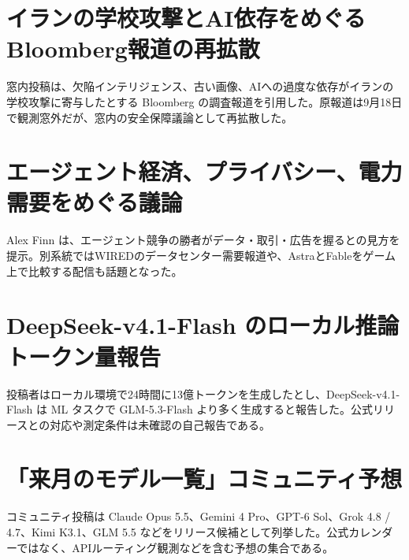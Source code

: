 \section{イランの学校攻撃とAI依存をめぐるBloomberg報道の再拡散}
窓内投稿は、欠陥インテリジェンス、古い画像、AIへの過度な依存がイランの学校攻撃に寄与したとする Bloomberg の調査報道を引用した。原報道は9月18日で観測窓外だが、窓内の安全保障議論として再拡散した。

\section{エージェント経済、プライバシー、電力需要をめぐる議論}
Alex Finn は、エージェント競争の勝者がデータ・取引・広告を握るとの見方を提示。別系統ではWIREDのデータセンター需要報道や、AstraとFableをゲーム上で比較する配信も話題となった。

\section{DeepSeek-v4.1-Flash のローカル推論トークン量報告}
投稿者はローカル環境で24時間に13億トークンを生成したとし、DeepSeek-v4.1-Flash は ML タスクで GLM-5.3-Flash より多く生成すると報告した。公式リリースとの対応や測定条件は未確認の自己報告である。

\section{「来月のモデル一覧」コミュニティ予想}
コミュニティ投稿は Claude Opus 5.5、Gemini 4 Pro、GPT-6 Sol、Grok 4.8 / 4.7、Kimi K3.1、GLM 5.5 などをリリース候補として列挙した。公式カレンダーではなく、APIルーティング観測などを含む予想の集合である。
